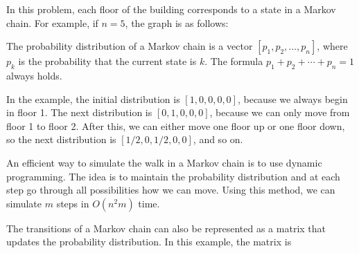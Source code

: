 In this problem, each floor of the building
corresponds to a state in a Markov chain.
For example, if $n=5$, the graph is as follows:

\begin{center}
\end{center}

The probability distribution
of a Markov chain is a vector
$[p_1,p_2,\ldots,p_n]$, where $p_k$ is the
probability that the current state is $k$.
The formula $p_1+p_2+\cdots+p_n=1$ always holds.

In the example, the initial distribution is
$[1,0,0,0,0]$, because we always begin in floor 1.
The next distribution is $[0,1,0,0,0]$,
because we can only move from floor 1 to floor 2.
After this, we can either move one floor up
or one floor down, so the next distribution is
$[1/2,0,1/2,0,0]$, and so on.

An efficient way to simulate the walk in
a Markov chain is to use dynamic programming.
The idea is to maintain the probability distribution
and at each step go through all possibilities
how we can move.
Using this method, we can simulate $m$ steps
in $O(n^2 m)$ time.

The transitions of a Markov chain can also be
represented as a matrix that updates the
probability distribution.
In this example, the matrix is

